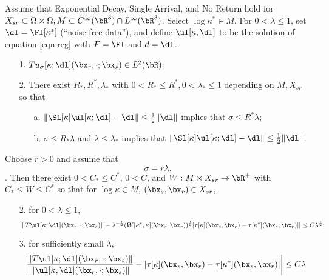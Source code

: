 \begin{theorem}
  \label{thm:main}
  Assume that Exponential Decay, Single Arrival, and No Return
  hold for $X_{sr} \subset \Omega \times \Omega, M \subset C^{\infty}(\bR^3) \cap L^{\infty}(\bR^3)$.
  Select $\log \kappa^* \in M$. For $0 <
  \lambda \le 1$, set
  $\dl=\Fl[\kappa^*]$ (``noise-free data''), and  define $\ul[\kappa,\dl]$
  to be the solution of 
  equation \ref{eqn:reg} with $F=\Fl$ and $d=\dl$..
  
  \begin{itemize}
  \item[1. ] $Tu_{\sigma}[\kappa;\dl](\bx_r,\cdot;\bx_s) \in
    L^2(\bR)$;
  \item[2. ] There exist $R_*,R^*,\lambda_*$ with $0<R_*\le R^*, 0 <
    \lambda_*\le 1$ depending on
    $M, X_{sr}$ so that
    \begin{itemize}
    \item[a. ] $\|\Sl[\kappa]\ul[\kappa;\dl]-\dl\| \le
      \frac{1}{2}\|\dl\|$ implies that $\sigma \le R^*\lambda$;
    \item[b. ] $\sigma \le R_*\lambda$ and $\lambda \le \lambda_*$
      implies that $\|\Sl[\kappa]\ul[\kappa;\dl]-\dl\| \le
      \frac{1}{2}\|\dl\|$.
    \end{itemize}
  \end{itemize}
  Choose $r > 0$ and assume that
  \begin{equation}
    \label{eqn:lamsig}
    \sigma = r \lambda.
  \end{equation}.
  Then there exist $0 < C_* \le C^*$, $0 < C$, and $W: M \times X_{sr}
  \rightarrow \bR^+$ with $C_* \le
  W \le C^*$ so that for
  $\log \kappa \in M$, $(\bx_s,\bx_r) \in X_{sr}$,
  \begin{itemize}
  \item[2. ] for $0 <  \lambda \le 1$, 
    \begin{equation}
      \label{eqn:mswitt}
      |\|T\ul[\kappa;\dl](\bx_r,\cdot;\bx_s)\|- \lambda^{-\frac{1}{2}} (W[\kappa^*,\kappa](\bx_s,\bx_r))^{\frac{1}{2}}|\tau[\kappa](\bx_s,\bx_r)-\tau[\kappa^*](\bx_s,\bx_r)|| \le C
      \lambda^{\frac{1}{2}};
    \end{equation}
  \item[3. ]for sufficiently small $\lambda$, 
    \begin{equation}
      \label{eqn:awitt}
      \left|\frac{\|T\ul[\kappa;\dl](\bx_r,\cdot;\bx_s)\|}{\|\ul[\kappa,\dl](\bx_r,\cdot;\bx_s)\|}-
        |\tau[\kappa](\bx_s,\bx_r)-\tau[\kappa^*](\bx_s,\bx_r)|\right| \le C \lambda
    \end{equation}
  \end{itemize}
\end{theorem}
